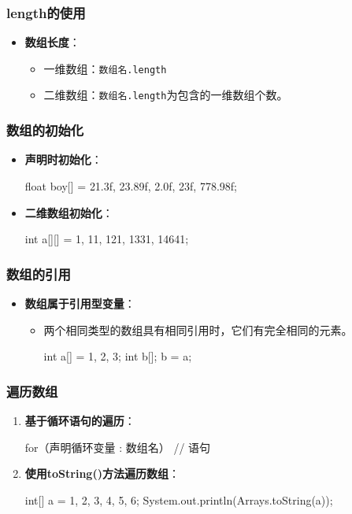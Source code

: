 \documentclass[a4paper, 10pt]{ctexart}
\begin{document}
\subsubsection{length的使用}
\begin{itemize}
  \item \textbf{数组长度}：
  \begin{itemize}
    \item 一维数组：\texttt{数组名.length}
    \item 二维数组：\texttt{数组名.length}为包含的一维数组个数。
  \end{itemize}
\end{itemize}

\subsubsection{数组的初始化}
\begin{itemize}
  \item \textbf{声明时初始化}：
  \begin{codeblock}
float boy[] = {21.3f, 23.89f, 2.0f, 23f, 778.98f};
  \end{codeblock}
  \item \textbf{二维数组初始化}：
  \begin{codeblock}
int a[][] = {{1}, {11}, {121}, {1331}, {14641}};
  \end{codeblock}
\end{itemize}

\subsubsection{数组的引用}
\begin{itemize}
  \item \textbf{数组属于引用型变量}：
  \begin{itemize}
    \item 两个相同类型的数组具有相同引用时，它们有完全相同的元素。
    \begin{codeblock}
int a[] = {1, 2, 3};
int b[];
b = a;
    \end{codeblock}
  \end{itemize}
\end{itemize}

\subsubsection{遍历数组}
\begin{enumerate}
  \item \textbf{基于循环语句的遍历}：
  \begin{codeblock}
for（声明循环变量 : 数组名） {
    // 语句
}
  \end{codeblock}
  \item \textbf{使用toString()方法遍历数组}：
  \begin{codeblock}
int[] a = {1, 2, 3, 4, 5, 6};
System.out.println(Arrays.toString(a));
  \end{codeblock}
\end{enumerate}
\end{document}
